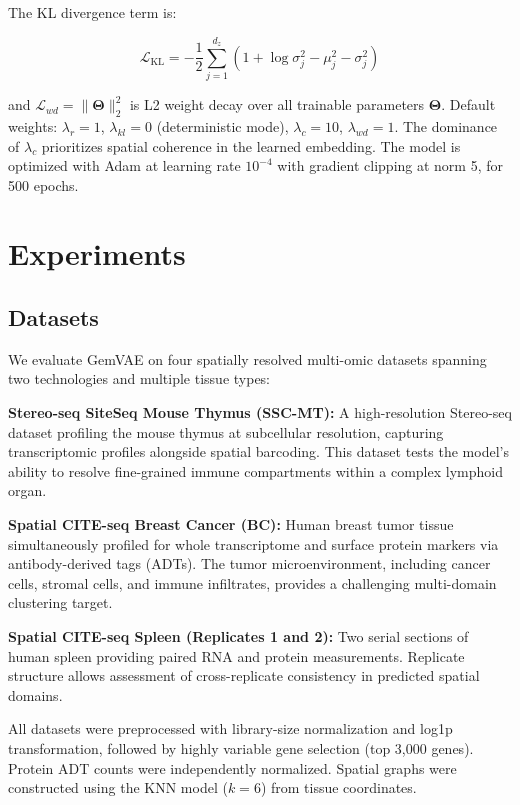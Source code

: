 \documentclass[conference]{IEEEtran}
\begin{document}
The KL divergence term is:

\begin{equation}
    \mathcal{L}_{\text{KL}} = -\frac{1}{2}\sum_{j=1}^{d_z}\left(1 + \log \sigma_j^2 - \mu_j^2 - \sigma_j^2\right)
\end{equation}

and $\mathcal{L}_{wd} = \|\boldsymbol{\Theta}\|_2^2$ is L2 weight decay over all trainable parameters $\boldsymbol{\Theta}$. Default weights: $\lambda_r = 1$, $\lambda_{kl} = 0$ (deterministic mode), $\lambda_c = 10$, $\lambda_{wd} = 1$. The dominance of $\lambda_c$ prioritizes spatial coherence in the learned embedding. The model is optimized with Adam \cite{b10} at learning rate $10^{-4}$ with gradient clipping at norm 5, for 500 epochs.

\section{Experiments}

\subsection{Datasets}

We evaluate GemVAE on four spatially resolved multi-omic datasets spanning two technologies and multiple tissue types:

\textbf{Stereo-seq SiteSeq Mouse Thymus (SSC-MT):} A high-resolution Stereo-seq dataset \cite{b14} profiling the mouse thymus at subcellular resolution, capturing transcriptomic profiles alongside spatial barcoding. This dataset tests the model's ability to resolve fine-grained immune compartments within a complex lymphoid organ.

\textbf{Spatial CITE-seq Breast Cancer (BC):} Human breast tumor tissue \cite{b9} simultaneously profiled for whole transcriptome and surface protein markers via antibody-derived tags (ADTs). The tumor microenvironment, including cancer cells, stromal cells, and immune infiltrates, provides a challenging multi-domain clustering target.

\textbf{Spatial CITE-seq Spleen (Replicates 1 and 2):} Two serial sections of human spleen providing paired RNA and protein measurements. Replicate structure allows assessment of cross-replicate consistency in predicted spatial domains.

All datasets were preprocessed with library-size normalization and log1p transformation, followed by highly variable gene selection (top 3,000 genes). Protein ADT counts were independently normalized. Spatial graphs were constructed using the KNN model ($k = 6$) from tissue coordinates.
\end{document}
